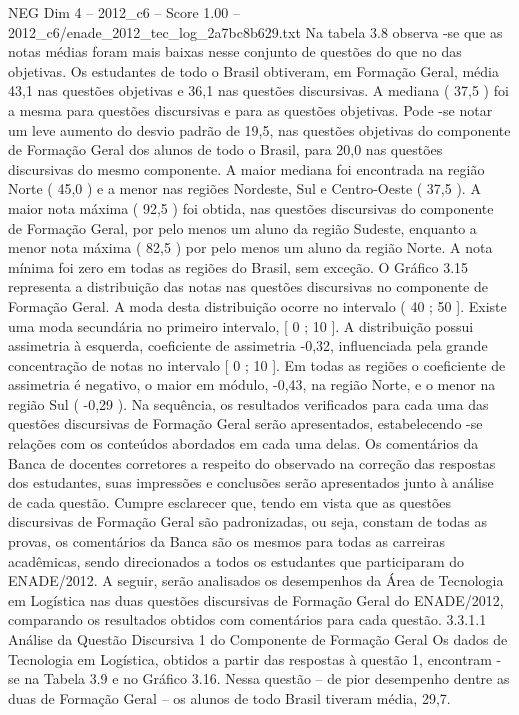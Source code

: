 \begin{textsample}{NEG Dim 4 – 2012\_c6 – Score 1.00 – 2012\_c6/enade\_2012\_tec\_log\_2a7bc8b629.txt}
Na tabela 3.8 observa -se que as notas médias foram mais baixas nesse conjunto de questões do que no das objetivas.
Os estudantes de todo o Brasil obtiveram, em Formação Geral, média 43,1 nas questões objetivas e 36,1 nas questões discursivas.
A mediana ( 37,5 ) foi a mesma para questões discursivas e para as questões objetivas.
Pode -se notar um leve aumento do desvio padrão de 19,5, nas questões objetivas do componente de Formação Geral dos alunos de todo o Brasil, para 20,0 nas questões discursivas do mesmo componente.
A maior mediana foi encontrada na região Norte ( 45,0 ) e a menor nas regiões Nordeste, Sul e Centro-Oeste ( 37,5 ).
A maior nota máxima ( 92,5 ) foi obtida, nas questões discursivas do componente de Formação Geral, por pelo menos um aluno da região Sudeste, enquanto a menor nota máxima ( 82,5 ) por pelo menos um aluno da região Norte.
A nota mínima foi zero em todas as regiões do Brasil, sem exceção.
O Gráfico 3.15 representa a distribuição das notas nas questões discursivas no componente de Formação Geral.
A moda desta distribuição ocorre no intervalo ( 40 ; 50 ].
Existe uma moda secundária no primeiro intervalo, [ 0 ; 10 ].
A distribuição possui assimetria à esquerda, coeficiente de assimetria -0,32, influenciada pela grande concentração de notas no intervalo [ 0 ; 10 ].
Em todas as regiões o coeficiente de assimetria é negativo, o maior em módulo, -0,43, na região Norte, e o menor na região Sul ( -0,29 ).
Na sequência, os resultados verificados para cada uma das questões discursivas de Formação Geral serão apresentados, estabelecendo -se relações com os conteúdos abordados em cada uma delas.
Os comentários da Banca de docentes corretores a respeito do observado na correção das respostas dos estudantes, suas impressões e conclusões serão apresentados junto à análise de cada questão.
Cumpre esclarecer que, tendo em vista que as questões discursivas de Formação Geral são padronizadas, ou seja, constam de todas as provas, os comentários da Banca são os mesmos para todas as carreiras acadêmicas, sendo direcionados a todos os estudantes que participaram do ENADE/2012.
A seguir, serão analisados os desempenhos da Área de Tecnologia em Logística nas duas questões discursivas de Formação Geral do ENADE/2012, comparando os resultados obtidos com comentários para cada questão. 3.3.1.1 Análise da Questão Discursiva 1 do Componente de Formação Geral Os dados de Tecnologia em Logística, obtidos a partir das respostas à questão 1, encontram -se na Tabela 3.9 e no Gráfico 3.16.
Nessa questão – de pior desempenho dentre as duas de Formação Geral – os alunos de todo Brasil tiveram média, 29,7.

\end{textsample}

